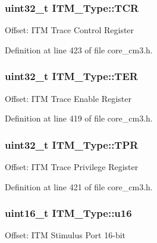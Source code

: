 \subsubsection[{\texorpdfstring{T\+CR}{TCR}}]{ {\bf uint32\+\_\+t} I\+T\+M\+\_\+\+Type\+::\+T\+CR}\hypertarget{struct_i_t_m___type_a58f169e1aa40a9b8afb6296677c3bb45}{}\label{struct_i_t_m___type_a58f169e1aa40a9b8afb6296677c3bb45}
Offset\+: I\+TM Trace Control Register 

Definition at line 423 of file core\+\_\+cm3.\+h.

\subsubsection[{\texorpdfstring{T\+ER}{TER}}]{ {\bf uint32\+\_\+t} I\+T\+M\+\_\+\+Type\+::\+T\+ER}\hypertarget{struct_i_t_m___type_a91a040e1b162e1128ac1e852b4a0e589}{}\label{struct_i_t_m___type_a91a040e1b162e1128ac1e852b4a0e589}
Offset\+: I\+TM Trace Enable Register 

Definition at line 419 of file core\+\_\+cm3.\+h.

\subsubsection[{\texorpdfstring{T\+PR}{TPR}}]{ {\bf uint32\+\_\+t} I\+T\+M\+\_\+\+Type\+::\+T\+PR}\hypertarget{struct_i_t_m___type_a93b480aac6da620bbb611212186d47fa}{}\label{struct_i_t_m___type_a93b480aac6da620bbb611212186d47fa}
Offset\+: I\+TM Trace Privilege Register 

Definition at line 421 of file core\+\_\+cm3.\+h.

\subsubsection[{\texorpdfstring{u16}{u16}}]{ {\bf uint16\+\_\+t} I\+T\+M\+\_\+\+Type\+::u16}\hypertarget{struct_i_t_m___type_a12aa4eb4d9dcb589a5d953c836f4e8f4}{}\label{struct_i_t_m___type_a12aa4eb4d9dcb589a5d953c836f4e8f4}
Offset\+: I\+TM Stimulus Port 16-\/bit 

